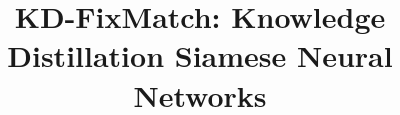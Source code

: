 \documentclass{article}
\title{KD-FixMatch: Knowledge Distillation Siamese Neural Networks}
\begin{document}
%
\maketitle
%

\end{document}
